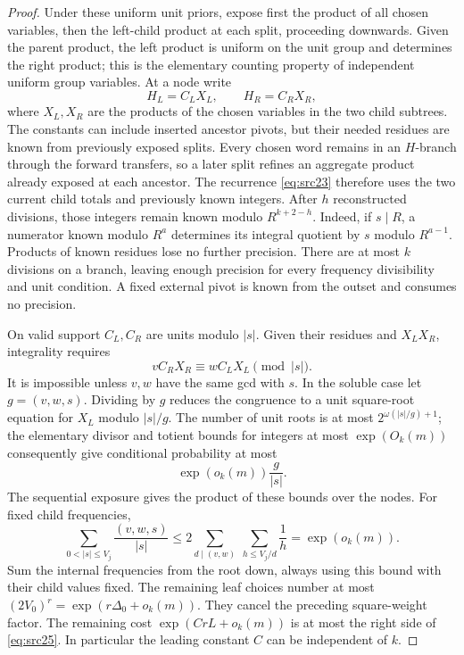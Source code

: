 \begin{proof}
Under these uniform unit priors, expose first the product of
all chosen variables, then the left-child product at each
split, proceeding downwards. Given the parent product, the
left product is uniform on the unit group and determines the
right product; this is the elementary counting property of
independent uniform group variables. At a node write
\[
 H_L=C_LX_L,\qquad H_R=C_RX_R,
\]
where \(X_L,X_R\) are the products of the chosen variables in
the two child subtrees. The constants can include inserted
ancestor pivots, but their needed residues are known from
previously exposed splits. Every chosen word remains in an
\(H\)-branch through the forward transfers, so a later split
refines an aggregate product already exposed at each ancestor.
The recurrence \eqref{eq:src23} therefore uses the two current
child totals and previously known integers.
After \(h\) reconstructed divisions, those integers remain known
modulo \(R^{k+2-h}\). Indeed, if \(s\mid R\), a numerator known
modulo \(R^a\) determines its integral quotient by \(s\) modulo
\(R^{a-1}\). Products of known residues lose no further precision.
There are at most \(k\) divisions on a branch, leaving enough
precision for every frequency divisibility and unit condition.
A fixed external pivot is known from the outset and consumes
no precision.

On valid support \(C_L,C_R\) are units modulo \(|s|\).
Given their residues and \(X_LX_R\), integrality requires
\[
 vC_RX_R\equiv wC_LX_L\pmod{|s|}.
\]
It is impossible unless \(v,w\) have the same gcd with \(s\).
In the soluble case let \(g=(v,w,s)\). Dividing by \(g\)
reduces the congruence to a unit square-root equation for
\(X_L\) modulo \(|s|/g\). The number of unit roots is at most
\(2^{\omega(|s|/g)+1}\); the elementary divisor and totient
bounds for integers at most \(\exp(O_k(m))\) consequently give
conditional probability at most
\[
 \exp(o_k(m))\frac{g}{|s|}.
\]
The sequential exposure gives the product of these bounds
over the nodes. For fixed child frequencies,
\[
 \sum_{0<|s|\le V_j}\frac{(v,w,s)}{|s|}
 \le 2\sum_{d\mid(v,w)}\ \sum_{h\le V_j/d}\frac1h
 =\exp(o_k(m)).
\]
Sum the internal frequencies from the root down, always using
this bound with their child values fixed. The remaining leaf
choices number at most
\((2V_0)^r=\exp(r\Delta_0+o_k(m))\).
They cancel the preceding square-weight factor.
The remaining cost \(\exp(CrL+o_k(m))\) is at most the
right side of \eqref{eq:src25}. In particular the leading
constant \(C\) can be independent of \(k\).


\end{proof}
